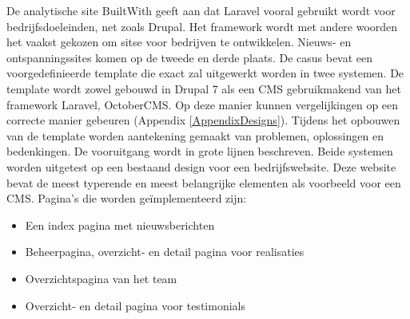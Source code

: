 \label{ch:casus}

De analytische site BuiltWith \citep{BuiltWith2016LaravelStatistics} geeft aan dat Laravel vooral gebruikt wordt voor bedrijfsdoeleinden, net zoals Drupal. Het framework wordt met andere woorden het vaakst gekozen om sitse voor bedrijven te ontwikkelen. Nieuws- en ontspanningssites komen op de tweede en derde plaats.  
\newline\newline
De casus bevat een voorgedefinieerde template die exact zal uitgewerkt worden in twee systemen. De template wordt zowel gebouwd in Drupal 7 als een CMS gebruikmakend van het framework Laravel, OctoberCMS. Op deze manier kunnen vergelijkingen op een correcte manier gebeuren (Appendix \ref{AppendixDesigns}).
\newline\newline
Tijdens het opbouwen van de template worden aantekening gemaakt van problemen, oplossingen en bedenkingen. De vooruitgang wordt in grote lijnen beschreven. 
\newline\newline
Beide systemen worden uitgetest op een bestaand design voor een bedrijfswebsite. Deze website bevat de meest typerende en meest belangrijke elementen als voorbeeld voor een CMS. Pagina's die worden geïmplementeerd zijn: 

\begin{itemize}
	\item{Een index pagina met nieuwsberichten}
    \item{Beheerpagina, overzicht- en detail pagina voor realisaties}
    \item{Overzichtspagina van het team}
    \item{Overzicht- en detail pagina voor testimonials}
\end{itemize}
